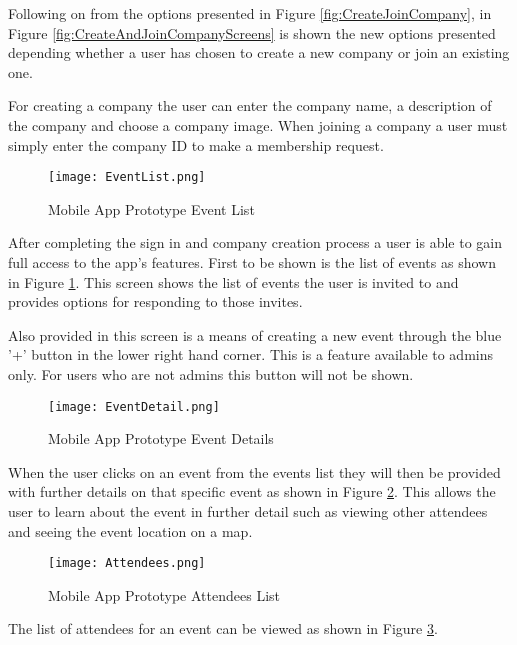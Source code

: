 Following on from the options presented in Figure \ref{fig:CreateJoinCompany}, in Figure \ref{fig:CreateAndJoinCompanyScreens} is shown the new options presented depending whether a user has chosen to create a new company or join an existing one. 

For creating a company the user can enter the company name, a description of the company and choose a company image. When joining a company a user must simply enter the company ID to make a membership request.

\clearpage
\begin{figure}[ht]
  \centering
      \texttt{[image: EventList.png]}
  \caption[Mobile App Prototype Event List]{Mobile App Prototype Event List}
  \label{fig:EventList}
\end{figure}

After completing the sign in and company creation process a user is able to gain full access to the app's features. First to be shown is the list of events as shown in Figure \ref{fig:EventList}. This screen shows the list of events the user is invited to and provides options for responding to those invites.

Also provided in this screen is a means of creating a new event through the blue '+' button in the lower right hand corner. This is a feature available to admins only. For users who are not admins this button will not be shown.

\begin{figure}[ht]
  \centering
      \texttt{[image: EventDetail.png]}
  \caption[Mobile App Prototype Event Details]{Mobile App Prototype Event Details}
  \label{fig:EventDetail}
\end{figure}

When the user clicks on an event from the events list they will then be provided with further details on that specific event as shown in Figure \ref{fig:EventDetail}. This allows the user to learn about the event in further detail such as viewing other attendees and seeing the event location on a map.

\clearpage
\begin{figure}[ht]
  \centering
      \texttt{[image: Attendees.png]}
  \caption[Mobile App Prototype Attendees List]{Mobile App Prototype Attendees List}
  \label{fig:AttendeesList}
\end{figure}

The list of attendees for an event can be viewed as shown in Figure \ref{fig:AttendeesList}.

